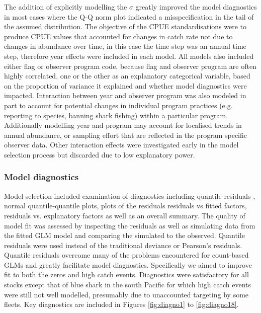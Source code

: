 The addition of explicitly modelling the $\sigma$ greatly improved the  model diagnostics in  most cases where the Q-Q norm plot indicated a misspecification in the tail of the assumed distribution.  The objective of the CPUE standardisations were to produce CPUE values that accounted for changes in catch rate not due to changes in abundance over time, in this case the time step was an annual time step, therefore year effects were included in each model. 
All models also included either flag or observer program code, because flag and observer program are often highly correlated, one or the other as an explanatory categorical variable, based on the proportion of variance it explained and whether model diagnostics were impacted.
Interaction between year and observer program was also modeled in part to account for potential changes in individual program practices (e.g. reporting to species, banning shark fishing) within a particular program.  Additionally modelling year and program may account for localised trends in annual abundance, or sampling effort that are reflected in the program specific observer data. Other interaction effects were investigated early in the model selection process but discarded due to low explanatory power.%
                                                                                    
\subsubsection{Model diagnostics}                                                                                      
Model selection included examination of diagnostics including quantile residuals \citep{Dunn1996_a}, normal quantile-quantile plots, plots of the residuals residuals vs fitted factors, residuals vs. explanatory factors as well as an overall summary.
The quality of model fit was assessed by inspecting the residuals as well as simulating data from the fitted GLM model and comparing the simulated to the observed. Quantile residuals  were used instead of the traditional deviance or Pearson’s residuals. Quantile residuals overcome many of the problems encountered for count-based GLMs and greatly facilitate model diagnostics. Specifically we aimed to improve fit to both the zeros and high catch events. Diagnostics were satisfactory for all stocks except that of blue shark in the south Pacific for which high catch events were still not well modelled, presumably due to unaccounted targeting by some fleets. Key diagnostics are included in Figures \ref{fig:diagno1} to \ref{fig:diagno18}.


